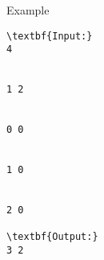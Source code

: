Example
\begin{verbatim}
\textbf{Input:}
4


1 2


0 0 


1 0


2 0

\textbf{Output:}
3 2
\end{verbatim}